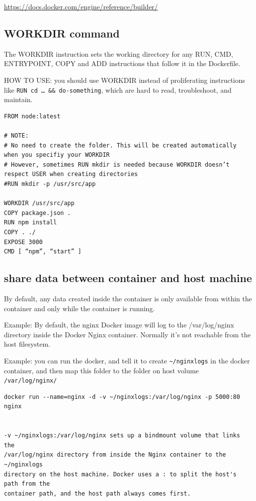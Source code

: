 \url{https://docs.docker.com/engine/reference/builder/}

\subsection{WORKDIR command}
\label{sec:Dockerfile-WORKDIR}

The WORKDIR instruction sets the working directory for any RUN, CMD, ENTRYPOINT,
COPY and ADD instructions that follow it in the Dockerfile.


HOW TO USE: you should use WORKDIR instead of proliferating instructions like
\verb!RUN cd … && do-something!, which are hard to read, troubleshoot, and maintain.

\begin{verbatim}
FROM node:latest

# NOTE: 
# No need to create the folder. This will be created automatically when you specifiy your WORKDIR
# However, sometimes RUN mkdir is needed because WORKDIR doesn’t respect USER when creating directories
#RUN mkdir -p /usr/src/app

WORKDIR /usr/src/app
COPY package.json .
RUN npm install
COPY . ./
EXPOSE 3000
CMD [ “npm”, “start” ] 
\end{verbatim}


\subsection{share data between container and host machine}

By default, any data created inside the container is only available from within
the container and only while the container is running.

Example:
By default, the nginx Docker image will log to the /var/log/nginx directory
inside the Docker Nginx container. Normally it's not reachable from the host
filesystem.

Example: you can run the docker, and tell it to create \verb!~/nginxlogs! in the docker container, and then map this folder to the 
folder on host volume \verb!/var/log/nginx/!
\begin{verbatim}
docker run --name=nginx -d -v ~/nginxlogs:/var/log/nginx -p 5000:80 nginx


-v ~/nginxlogs:/var/log/nginx sets up a bindmount volume that links the
/var/log/nginx directory from inside the Nginx container to the ~/nginxlogs
directory on the host machine. Docker uses a : to split the host's path from the
container path, and the host path always comes first.

\end{verbatim}

